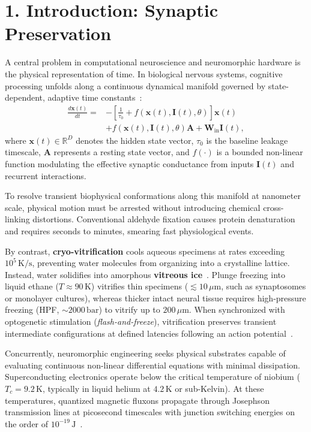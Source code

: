 \documentclass[10pt,twocolumn,letterpaper]{article}
\begin{document}
\section*{1. Introduction: Synaptic Preservation}

A central problem in computational neuroscience and neuromorphic hardware is the physical representation of time. In biological nervous systems, cognitive processing unfolds along a continuous dynamical manifold governed by state-dependent, adaptive time constants~\cite{hasani2021liquid}:
\begin{equation}
\begin{aligned}
  \frac{d\mathbf{x}(t)}{dt} = &-\left[\frac{1}{\tau_0} + f(\mathbf{x}(t), \mathbf{I}(t), \theta)\right]\mathbf{x}(t) \\
  &+ f(\mathbf{x}(t), \mathbf{I}(t), \theta)\mathbf{A} + \mathbf{W}_{\text{in}}\mathbf{I}(t),
\end{aligned}
\label{eq:neural_ode}
\end{equation}
where $\mathbf{x}(t) \in \mathbb{R}^D$ denotes the hidden state vector, $\tau_0$ is the baseline leakage timescale, $\mathbf{A}$ represents a resting state vector, and $f(\cdot)$ is a bounded non-linear function modulating the effective synaptic conductance from inputs $\mathbf{I}(t)$ and recurrent interactions.

To resolve transient biophysical conformations along this manifold at nanometer scale, physical motion must be arrested without introducing chemical cross-linking distortions. Conventional aldehyde fixation causes protein denaturation and requires seconds to minutes, smearing fast physiological events.

By contrast, \textbf{cryo-vitrification} cools aqueous specimens at rates exceeding $10^5\,\text{K/s}$, preventing water molecules from organizing into a crystalline lattice. Instead, water solidifies into amorphous \textbf{vitreous ice}~\cite{watanabe2013flash}. Plunge freezing into liquid ethane ($T \approx 90\,\text{K}$) vitrifies thin specimens ($\lesssim 10\,\mu\text{m}$, such as synaptosomes or monolayer cultures), whereas thicker intact neural tissue requires high-pressure freezing (HPF, $\sim 2000\,\text{bar}$) to vitrify up to $200\,\mu\text{m}$. When synchronized with optogenetic stimulation (\textit{flash-and-freeze}), vitrification preserves transient intermediate configurations at defined latencies following an action potential~\cite{watanabe2018synaptic,imig2014ultrastructural}.

Concurrently, neuromorphic engineering seeks physical substrates capable of evaluating continuous non-linear differential equations with minimal dissipation. Superconducting electronics operate below the critical temperature of niobium ($T_c = 9.2\,\text{K}$, typically in liquid helium at $4.2\,\text{K}$ or sub-Kelvin). At these temperatures, quantized magnetic fluxons propagate through Josephson transmission lines at picosecond timescales with junction switching energies on the order of $10^{-19}\,\text{J}$~\cite{crotty2010josephson,schneider2018ultralow}.
\end{document}
